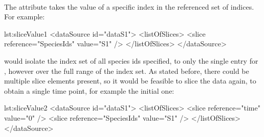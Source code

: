 \paragraph*{}
\label{sec:sliceValue}
The  attribute takes the value of a specific index in the referenced set of indices. For example:

\begin{myXmlLst}{}{lst:sliceValue1}
<dataSource id="dataS1">
	<listOfSlices>
		<slice reference="SpeciesIds" value="S1" />
	</listOfSlices>
</dataSource>
\end{myXmlLst} 

would isolate the index set of all species ids specified, to only the single entry for , however over the full range of the  index set. As stated before, there could be multiple slice elements present, so it would be feasible to slice the data again, to obtain a single time point, for example the initial one:

\begin{myXmlLst}{}{lst:sliceValue2}
<dataSource id="dataS1">
	<listOfSlices>
		<slice reference="time" value="0" />
		<slice reference="SpeciesIds" value="S1" />
	</listOfSlices>
</dataSource>
\end{myXmlLst} 
